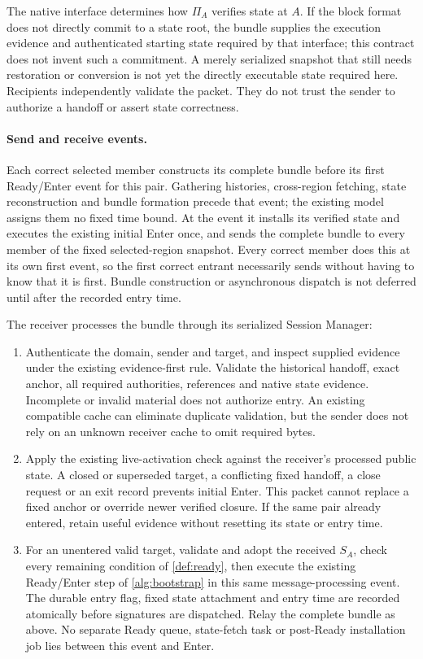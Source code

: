The native interface determines how $\Pi_A$ verifies state at $A$.
If the block format does not directly commit to a state root, the
bundle supplies the execution evidence and authenticated starting state
required by that interface; this contract does not invent such a
commitment. A merely serialized snapshot that still needs restoration
or conversion is not yet the directly executable state required here.
Recipients independently validate the packet. They do not trust the
sender to authorize a handoff or assert state correctness.

\paragraph{Send and receive events.}
Each correct selected member constructs its complete bundle before its
first Ready/Enter event for this pair. Gathering histories, cross-region
fetching, state reconstruction and bundle formation precede that event;
the existing model assigns them no fixed time bound. At the event it
installs its verified state and executes the existing initial Enter
once, and sends the complete bundle to every member of the fixed
selected-region snapshot. Every correct member does this at its own
first event, so the first correct entrant necessarily sends without
having to know that it is first. Bundle construction or asynchronous
dispatch is not deferred until after the recorded entry time.

The receiver processes the bundle through its serialized Session Manager:
\begin{enumerate}[label=(\roman*),itemsep=2pt]
\item Authenticate the domain, sender and target, and inspect supplied
evidence under the existing evidence-first rule. Validate the historical
handoff, exact anchor, all required authorities, references and native
state evidence. Incomplete or invalid material does not authorize entry.
An existing compatible cache can eliminate duplicate validation, but the
sender does not rely on an unknown receiver cache to omit required bytes.
\item Apply the existing live-activation check against the receiver's
processed public state. A closed or superseded target, a conflicting fixed
handoff, a close request or an exit record prevents initial Enter. This
packet cannot replace a fixed anchor or override newer verified closure.
If the same pair already entered, retain useful evidence without resetting
its state or entry time.
\item For an unentered valid target, validate and adopt the received
$S_A$, check every remaining condition of \cref{def:ready}, then execute
the existing Ready/Enter step of \cref{alg:bootstrap} in this same
message-processing event. The durable entry flag, fixed state attachment
and entry time are recorded atomically before signatures are dispatched.
Relay the complete bundle as above. No separate Ready queue, state-fetch
task or post-Ready installation job lies between this event and Enter.
\end{enumerate}

